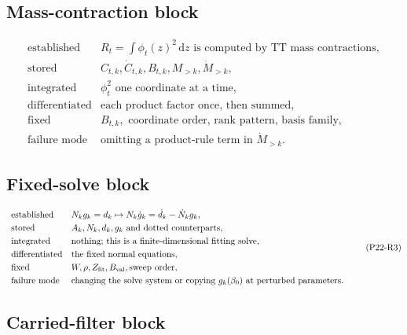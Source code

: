 \documentclass[11pt]{article}
\newcommand{\dd}{\,\mathrm d}
\begin{document}
\subsection*{Mass-contraction block}

\[
\begin{array}{ll}
\text{established} &
    R_t=\int\phi_t(z)^2\dd z
    \text{ is computed by TT mass contractions},\\[1mm]
\text{stored} &
    C_{t,k},\dot C_{t,k},B_{t,k},M_{>k},\dot M_{>k},\\[1mm]
\text{integrated} &
    \phi_t^2 \text{ one coordinate at a time},\\[1mm]
\text{differentiated} &
    \text{each product factor once, then summed},\\[1mm]
\text{fixed} &
    B_{t,k},\text{ coordinate order, rank pattern, basis family},\\[1mm]
\text{failure mode} &
    \text{omitting a product-rule term in } \dot M_{>k}.
\end{array}
\tag{P22-R2}
\]

\subsection*{Fixed-solve block}

\[
\begin{array}{ll}
\text{established} &
    N_k g_k=d_k
    \mapsto
    N_k\dot g_k=\dot d_k-\dot N_k g_k,\\[1mm]
\text{stored} &
    A_k,N_k,d_k,g_k \text{ and dotted counterparts},\\[1mm]
\text{integrated} &
    \text{nothing; this is a finite-dimensional fitting solve},\\[1mm]
\text{differentiated} &
    \text{the fixed normal equations},\\[1mm]
\text{fixed} &
    W,\rho,Z_{\rm fit},B_{\rm val},\text{sweep order},\\[1mm]
\text{failure mode} &
    \text{changing the solve system or copying }g_k(\beta_0)
    \text{ at perturbed parameters.}
\end{array}
\tag{P22-R3}
\]

\subsection*{Carried-filter block}
\end{document}
